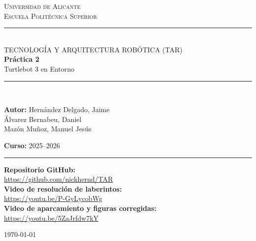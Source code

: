 \begin{titlepage}
  \centering

  \vspace*{1cm}

  {\Large \textsc{Universidad de Alicante}}\\[0.3cm]
  {\large \textsc{Escuela Politécnica Superior}}\\[0.5cm]
  \rule{\linewidth}{0.4pt}\\[0.4cm]

  {\large TECNOLOGÍA Y ARQUITECTURA ROBÓTICA (TAR)}\\[1.5cm]

  {\Huge \bfseries \color{azulROS} Práctica 2}\\[0.5cm]
  {\LARGE  Turtlebot 3 en Entorno}\\[2cm]

  \rule{\linewidth}{0.4pt}\\[0.8cm]

  \begin{minipage}{0.45\textwidth}
    \begin{flushleft}
      \textbf{Autor:}
     	Hernández Delgado, Jaime \\
        Álvarez Bernabeu, Daniel \\
        Mazón Muñoz, Manuel Jesús
    \end{flushleft}
  \end{minipage}
  \hfill
  \begin{minipage}{0.45\textwidth}
    \begin{flushright}
      \textbf{Curso:} 2025--2026\\
    \end{flushright}
  \end{minipage}

  \vspace{1.5cm}
  \rule{\linewidth}{0.4pt}

  \vfill

  \textbf{Repositorio GitHub:}\\
  \url{https://github.com/nickhernd/TAR} \\
    \textbf{Video de resolución de laberintos:}\\
  \url{https://youtu.be/P-GyLycobWg} \\
  	\textbf{Video de aparcamiento y figuras corregidas:}\\
  \url{https://youtu.be/5ZaJrfdw7kY}

  \vspace{1cm}
  {\large \today}

\end{titlepage}

\newpage
